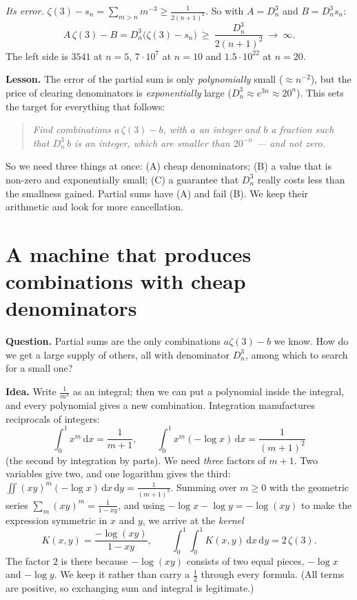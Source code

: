 \documentclass[11pt]{article}
\newcommand{\dd}{\,\mathrm d}
\theoremstyle{remark}
\newcommand{\q}[1]{\medskip\noindent\textbf{#1}}
\begin{document}
\emph{Its error.} $\zeta(3)-s_n=\sum_{m>n}m^{-3}\ge\frac1{2(n+1)^2}$. So with $A=D_n^3$ and
$B=D_n^3s_n$:
\[
A\,\zeta(3)-B=D_n^3\bigl(\zeta(3)-s_n\bigr)\ \ge\ \frac{D_n^3}{2(n+1)^2}\ \to\ \infty .
\]
The left side is $3541$ at $n=5$, $7\cdot10^7$ at $n=10$ and $1.5\cdot10^{22}$ at $n=20$.

\q{Lesson.} The error of the partial sum is only \emph{polynomially} small ($\approx n^{-2}$), but
the price of clearing denominators is \emph{exponentially} large ($D_n^3\approx e^{3n}\approx20^n$).
This sets the target for everything that follows:

\begin{quote}
\emph{Find combinations $a\,\zeta(3)-b$, with $a$ an integer and $b$ a fraction such that
$D_n^3\,b$ is an integer, which are smaller than $20^{-n}$ --- and not zero.}
\end{quote}

\noindent So we need three things at once: (A) cheap denominators; (B) a value that is non-zero and
exponentially small; (C) a guarantee that $D_n^3$ really costs less than the smallness gained.
Partial sums have (A) and fail (B). We keep their arithmetic and look for more cancellation.

\section{A machine that produces combinations with cheap denominators}

\q{Question.} Partial sums are the only combinations $a\zeta(3)-b$ we know. How do we get a large
supply of others, all with denominator $D_n^3$, among which to search for a small one?

\q{Idea.} Write $\frac1{m^3}$ as an integral; then we can put a polynomial inside the integral,
and every polynomial gives a new combination. Integration manufactures reciprocals of integers:
\[
\int_0^1x^{m}\dd x=\frac1{m+1},\qquad\int_0^1x^{m}(-\log x)\dd x=\frac1{(m+1)^2}
\]
(the second by integration by parts). We need \emph{three} factors of $m+1$. Two variables give
two, and one logarithm gives the third:
$\iint(xy)^m(-\log x)\dd x\dd y=\frac1{(m+1)^3}$. Summing over $m\ge0$ with the geometric series
$\sum_m(xy)^m=\frac1{1-xy}$, and using $-\log x-\log y=-\log(xy)$ to make the expression symmetric
in $x$ and $y$, we arrive at the \emph{kernel}
\begin{equation}\label{kernel}
K(x,y)=\frac{-\log(xy)}{1-xy},\qquad\int_0^1\!\!\int_0^1K(x,y)\dd x\dd y=2\,\zeta(3).
\end{equation}
The factor $2$ is there because $-\log(xy)$ consists of two equal pieces, $-\log x$ and $-\log y$.
We keep it rather than carry a $\frac12$ through every formula. (All terms are positive, so
exchanging sum and integral is legitimate.)
\end{document}
